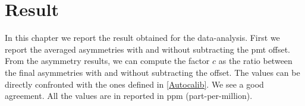 \chapter{Result} \label{result}


In this chapter we report the result obtained for the data-analysis. First we report the averaged asymmetries with and without subtracting the pmt offset. From the asymmetry results, we can compute the factor $c$ as the ratio between the final asymmetries with and without subtracting the offset. The values can be directly confronted with the ones defined in \ref{Autocalib}. We see a good agreement. All the values are in reported in ppm (part-per-million).

